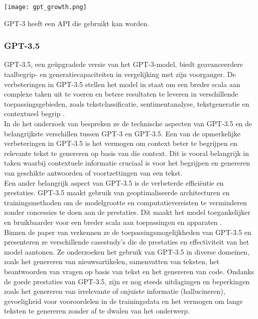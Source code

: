 \begin{center}
    \texttt{[image: gpt\_growth.png]}
    \label{fig:gpt_growth}
\end{center}

GPT-3 heeft een API die gebruikt kan worden.

\subsubsection{GPT-3.5}
GPT-3.5, een geüpgradede versie van het GPT-3-model, biedt geavanceerdere taalbegrip- en generatiecapaciteiten in vergelijking met zijn voorganger. De verbeteringen in GPT-3.5 stellen het model in staat om een breder scala aan complexe taken uit te voeren en betere resultaten te leveren in verschillende toepassingsgebieden, zoals tekstclassificatie, sentimentanalyse, tekstgeneratie en contextueel begrip \autocite{gpt_nappier, gpt_cn}. \\

In de het onderzoek van \textcite{gpt_nappier} bespreken ze de technische aspecten van GPT-3.5 en de belangrijkste verschillen tussen GPT-3 en GPT-3.5. Een van de opmerkelijke verbeteringen in GPT-3.5 is het vermogen om context beter te begrijpen en relevante tekst te genereren op basis van die context. Dit is vooral belangrijk in taken waarbij contextuele informatie cruciaal is voor het begrijpen en genereren van geschikte antwoorden of voortzettingen van een tekst. \\

Een ander belangrijk aspect van GPT-3.5 is de verbeterde efficiëntie en prestaties. GPT-3.5 maakt gebruik van geoptimaliseerde architecturen en trainingsmethoden om de modelgrootte en computatievereisten te verminderen zonder concessies te doen aan de prestaties. Dit maakt het model toegankelijker en bruikbaarder voor een breder scala aan toepassingen en apparaten \autocite{gpt_nappier}. \\

Binnen de paper van \textcite{gpt_cn} verkennen ze de  toepassingsmogelijkheden van GPT-3.5 en presenteren ze verschillende casestudy's die de prestaties en effectiviteit van het model aantonen. Ze onderzoeken het gebruik van GPT-3.5 in diverse domeinen, zoals het genereren van nieuwsartikelen, samenvatten van teksten, het beantwoorden van vragen op basis van tekst en het genereren van code. Ondanks de goede prestaties van GPT-3.5, zijn er nog steeds uitdagingen en beperkingen zoals het genereren van irrelevante of onjuiste informatie (hallucineren), gevoeligheid voor vooroordelen in de trainingsdata en het vermogen om lange teksten te genereren zonder af te dwalen van het onderwerp. \\

